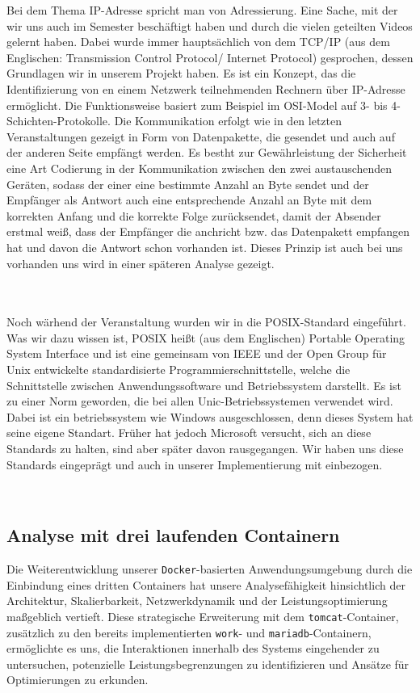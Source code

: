 {Bei dem Thema IP-Adresse spricht man von Adressierung. Eine Sache, mit der wir uns auch im Semester beschäftigt haben und durch die vielen geteilten Videos gelernt haben. Dabei wurde immer hauptsächlich von dem TCP/IP (aus dem Englischen: Transmission Control Protocol/ Internet Protocol) gesprochen, dessen Grundlagen wir in unserem Projekt haben. Es ist ein Konzept, das die Identifizierung von en einem Netzwerk teilnehmenden Rechnern über IP-Adresse ermöglicht. Die Funktionsweise basiert zum Beispiel im OSI-Model auf 3- bis 4-Schichten-Protokolle. Die Kommunikation erfolgt wie in den letzten Veranstaltungen gezeigt in Form von Datenpakette, die gesendet und auch auf der anderen Seite empfängt werden. Es bestht zur Gewährleistung der Sicherheit eine Art Codierung in der Kommunikation zwischen den zwei austauschenden Geräten, sodass der einer eine bestimmte Anzahl an Byte sendet und der Empfänger als Antwort auch eine entsprechende Anzahl an Byte mit dem korrekten Anfang und die korrekte Folge zurücksendet, damit der Absender erstmal weiß, dass der Empfänger die anchricht bzw. das Datenpakett empfangen hat und davon die Antwort schon vorhanden ist. Dieses Prinzip ist auch bei uns vorhanden uns wird in einer späteren Analyse gezeigt.

\\
\\

Noch wärhend der Veranstaltung wurden wir in die POSIX-Standard eingeführt. Was wir dazu wissen ist, POSIX heißt (aus dem Englischen) Portable Operating System Interface und ist eine gemeinsam von IEEE und der Open Group für Unix entwickelte standardisierte Programmierschnittstelle, welche die Schnittstelle zwischen Anwendungssoftware und Betriebssystem darstellt. Es ist zu einer Norm geworden, die bei allen Unic-Betriebssystemen verwendet wird. Dabei ist ein betriebssystem wie Windows ausgeschlossen, denn dieses System hat seine eigene Standart. Früher hat jedoch Microsoft versucht, sich an diese Standards zu halten, sind aber später davon rausgegangen. Wir haben uns diese Standards eingeprägt und auch in unserer Implementierung mit einbezogen.

\\




\subsection{Analyse mit drei laufenden Containern}

Die Weiterentwicklung unserer \texttt{Docker}-basierten Anwendungsumgebung durch die Einbindung eines dritten Containers hat unsere Analysefähigkeit hinsichtlich der Architektur, Skalierbarkeit, Netzwerkdynamik und der Leistungsoptimierung maßgeblich vertieft. Diese strategische Erweiterung mit dem \texttt{tomcat}-Container, zusätzlich zu den bereits implementierten \texttt{work}- und \texttt{mariadb}-Containern, ermöglichte es uns, die Interaktionen innerhalb des Systems eingehender zu untersuchen, potenzielle Leistungsbegrenzungen zu identifizieren und Ansätze für Optimierungen zu erkunden.


}
